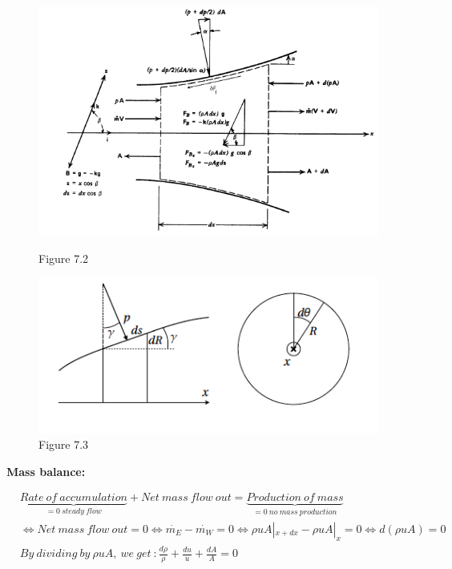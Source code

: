 \begin{figure}[H]
\centering
\begin{minipage}{.5\textwidth}
  \centering
  \includegraphics[scale=0.30]{ch7/chap72.png}
  \caption*{Figure 7.2}
  \label{fig:test1}
\end{minipage}%
\begin{minipage}{.5\textwidth}
  \centering
  \includegraphics[scale=0.30]{ch7/chap73.png}
  \caption*{Figure 7.3}
  \label{fig:test2}
\end{minipage}
\end{figure}

\textbf{Mass balance:} 

\begin{equation}
\begin{aligned}
&\underbrace{Rate\ of\ accumulation}_{=0\ steady\ flow}+Net\ mass\ flow\ out=\underbrace{Production\ of\ mass}_{=0\ no\ mass\ production} \\
&\Leftrightarrow Net\ mass\ flow\ out=0 \Leftrightarrow \dot{m_E}-\dot{m_W}=0 \Leftrightarrow \rho u A|_{x+dx}-\rho u A|_{x}=0 \Leftrightarrow d(\rho u A)=0 \\
&By\ dividing\ by\ \rho u A,\ we\ get\ : \frac{d \rho}{\rho}+\frac{du}{u}+\frac{dA}{A}=0
\end{aligned}
\end{equation}

